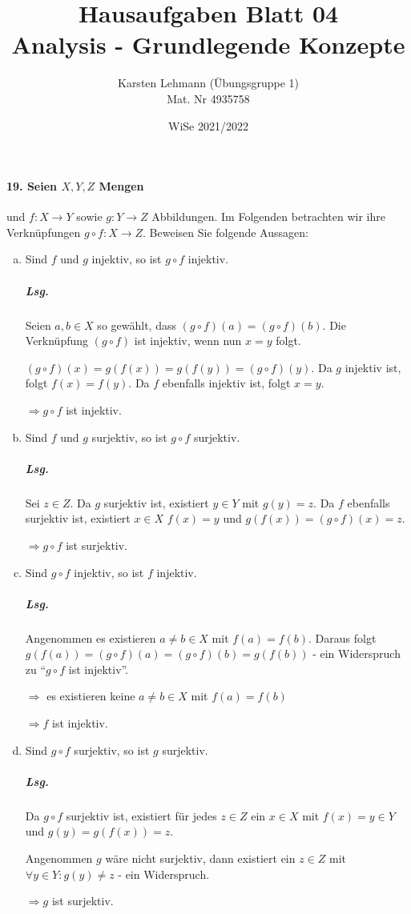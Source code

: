 \documentclass{scrreprt}
\author{Karsten Lehmann (Übungsgruppe 1)\\Mat. Nr 4935758}
\date{WiSe 2021/2022}
\title{Hausaufgaben Blatt 04\\Analysis - Grundlegende Konzepte}
\begin{document}
\paragraph{19. Seien $X, Y, Z$ Mengen} und $f \colon X \to Y$ sowie
$g \colon Y \to Z$ Abbildungen.
Im Folgenden betrachten wir ihre Verknüpfungen $g \circ f \colon X \to Z$.
Beweisen Sie folgende Aussagen:
\begin{enumerate}[(a)]
\item Sind $f$ und $g$ injektiv, so ist $g \circ f$ injektiv.

  \subparagraph{Lsg.} Seien $a, b \in X$ so gewählt, dass
  $(g \circ f)(a) = (g \circ f)(b)$.
  Die Verknüpfung $(g \circ f)$ ist injektiv, wenn nun $x = y$ folgt.

  $(g \circ f)(x) = g(f(x)) = g(f(y)) = (g \circ f)(y)$.
  Da $g$ injektiv ist, folgt $f(x) = f(y)$.
  Da $f$ ebenfalls injektiv ist, folgt $x = y$.

  $\Rightarrow g \circ f$ ist injektiv.

\item Sind $f$ und $g$ surjektiv, so ist $g \circ f$ surjektiv.

  \subparagraph{Lsg.} Sei $z \in Z$.
  Da $g$ surjektiv ist, existiert $y \in Y$ mit $g(y) = z$.
  Da $f$ ebenfalls surjektiv ist, existiert $x \in X$
  $f(x) = y$ und $g(f(x)) = (g \circ f)(x) = z$.

  $\Rightarrow g \circ f$ ist surjektiv.

\item Sind $g \circ f$ injektiv, so ist $f$ injektiv.

  \subparagraph{Lsg.} Angenommen es existieren $a \ne b \in X$ mit
  $f(a) = f(b)$.
  Daraus folgt $g(f(a)) = (g \circ f)(a) = (g \circ f)(b) = g(f(b))$
  - ein Widerspruch zu ``$g \circ f$ ist injektiv''.

  $\Rightarrow$ es existieren keine $a \ne b \in X$ mit $f(a) = f(b)$

  $\Rightarrow f$ ist injektiv.

\item Sind $g \circ f$ surjektiv, so ist $g$ surjektiv.

  \subparagraph{Lsg.} Da $g \circ f$ surjektiv ist, existiert für jedes
  $z \in Z$ ein $x \in X$ mit $f(x) = y \in Y$ und $g(y) = g(f(x)) = z$.

  Angenommen $g$ wäre nicht surjektiv,
  dann existiert ein $z \in Z$ mit $\forall y \in Y \colon g(y) \ne z$ - ein
  Widerspruch.

  $\Rightarrow g$ ist surjektiv.
\end{enumerate}
\end{document}
